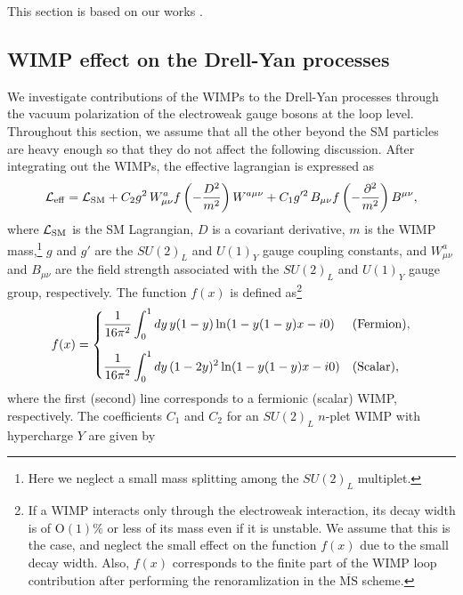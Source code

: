 \documentclass[12pt,twoside,book]{article}
\begin{document}
This section is based on our works \cite{Chigusa:2018vxz, Abe:2019egv}.


\subsection{WIMP effect on the Drell-Yan processes}
\label{sec:WIMP}

We investigate contributions of the WIMPs to the Drell-Yan processes through the vacuum polarization of the electroweak gauge bosons at the loop level.
Throughout this section, we assume that all the other beyond the SM particles are heavy enough so that they do not affect the following discussion.
After integrating out the WIMPs, the effective lagrangian is expressed as
\begin{align}
 \mathcal{L}_{\rm eff} = \mathcal{L}_{\rm SM} + C_2 g^2\, W_{\mu \nu}^a
 f\left(-\frac{D^2}{m^2}\right) W^{a\mu\nu} + C_1 g'^2\, B_{\mu\nu}
 f\left(-\frac{\partial^2}{m^2}\right) B^{\mu\nu},\label{eq_lag}
\end{align}
where $\mathcal{L}_{\rm SM}$ is the SM Lagrangian, $D$ is a covariant derivative, $m$ is the WIMP mass,\footnote
{
  Here we neglect a small mass splitting among the $SU(2)_L$ multiplet.
}
$g$ and $g'$ are the $SU(2)_L$ and $U(1)_Y$ gauge coupling constants, and $W_{\mu\nu}^a$ and $B_{\mu\nu}$ are the field strength associated with the $SU(2)_L$ and $U(1)_Y$ gauge group, respectively.
The function $f(x)$ is defined as\footnote
{
  If a WIMP interacts only through the electroweak interaction, its decay width is of $\mathrm{O}(1)\%$ or less of its mass even if it is unstable.
  We assume that this is the case, and neglect the small effect on the function $f(x)$ due to the small decay width.
  Also, $f(x)$ corresponds to the finite part of the WIMP loop contribution after performing the renoramlization in the $\overline{\mathrm{MS}}$ scheme.
}
\begin{align}
 f(x) = \begin{cases}
	 \displaystyle{\frac{1}{16\pi^2} \int_0^1 dy\, y(1-y) \ln (1 -
	 y(1-y)x - i0)} & {\rm (Fermion)},\\[5mm]
	 \displaystyle{\frac{1}{16\pi^2} \int_0^1 dy\, (1-2y)^2 \ln (1-
	 y(1-y)x - i0)} & {\rm (Scalar)},
	\end{cases}\label{eq_f}
\end{align}
where the first (second) line corresponds to a fermionic (scalar) WIMP, respectively.
The coefficients $C_1$ and $C_2$ for an $SU(2)_L$ $n$-plet WIMP with hypercharge $Y$ are given by
\end{document}
